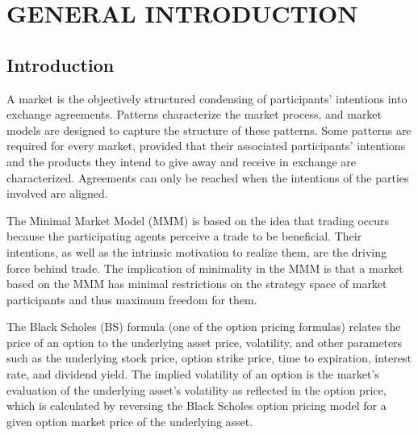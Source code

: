 \documentclass[a4 paper, 12pt]{report}
\theoremstyle{plain}
\begin{document}
\newpage 
\tableofcontents
{}




\newpage
{}




\chapter{GENERAL INTRODUCTION}
\section{Introduction}
\noindent
\par A market is the objectively structured condensing of participants' intentions into exchange agreements. Patterns characterize the market process, and market models are designed to capture the structure of these patterns. Some patterns are required for every market, provided that their associated participants' intentions and the products they intend to give away and receive in exchange are characterized. Agreements can only be reached when the intentions of the parties involved are aligned.\\

\par The Minimal Market Model (MMM) is based on the idea that trading occurs because the participating agents perceive a trade to be beneficial. Their intentions, as well as the intrinsic motivation to realize them, are the driving force behind trade. The implication of minimality in the MMM is that a market based on the MMM has minimal restrictions on the strategy space of market participants and thus maximum freedom for them.\\

\par The Black Scholes (BS) formula (one of the option pricing formulas) relates the price of an option to the underlying asset price, volatility, and other parameters such as the underlying stock price, option strike price, time to expiration, interest rate, and dividend yield. The implied volatility of an option is the market's evaluation of the underlying asset's volatility as reflected in the option price, which is calculated by reversing the Black Scholes option pricing model for a given option market price of the underlying asset.\\
\end{document}
